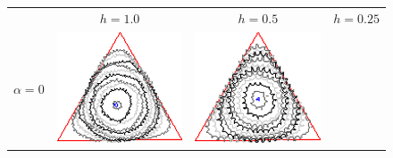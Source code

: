 \begin{figure}
\center
\begin{tabular}{p{2.5em}ccc}
& $h=1.0$ & $h=0.5$ & $h=0.25$ \\[2em]
\multirow{2}{*}{$\alpha=0$}& \includegraphics[scale=0.25]{figures/chapter6/radius-effect/triangle/improve/len_pen0/radius-3/summary.pdf} &
\includegraphics[scale=0.24]{figures/chapter6/radius-effect/triangle/improve/len_pen0/radius-5/summary.pdf} &

\end{tabular}
\end{figure}
